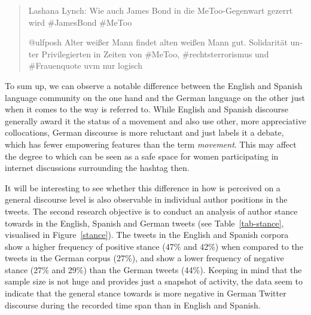 \documentclass[output=paper,english,spanish,german,english]{langsci/langscibook}
\begin{document}
\begin{quote}\sffamily
  \foreignlanguage{german}{Lashana Lynch: Wie auch James Bond in die MeToo-Gegenwart gezerrt wird \#JamesBond \#MeToo}

  \foreignlanguage{german}{@ulfposh Alter weißer Mann findet alten weißen Mann gut. Solidarität unter Privilegierten in Zeiten von \#MeToo, \#rechtsterrorismus und \#Frauenquote uvm nur logisch}
\end{quote}

To sum up, we can observe a notable difference between the English and Spanish language community on the one hand and the German language on the other just when it comes to the way \mt is referred to. While English and Spanish discourse generally award it the status of a movement and also use other, more appreciative collocations, German discourse is more reluctant and just labels it a debate, which has fewer empowering features than the term \textit{movement}. This may affect the degree to which \mt can be seen as a safe space for women participating in internet discussions surrounding the hashtag then.

It will be interesting to see whether this difference in how \mt is perceived on a general discourse level is also observable in individual author positions in the tweets. The second research objective is to conduct an analysis of author stance towards \mt in the English, Spanish and German tweets (see Table~\ref{tab-stance}, visualised in Figure~\ref{stance}). The tweets in the English and Spanish corpora show a higher frequency of positive stance (47\% and 42\%) when compared to the tweets in the German corpus (27\%), and show a lower frequency of negative stance (27\% and 29\%) than the German tweets (44\%). Keeping in mind that the sample size is not huge and provides just a snapshot of activity, the data seem to indicate that the general stance towards \mt is more negative in German Twitter discourse during the recorded time span than in English and Spanish.
\end{document}
